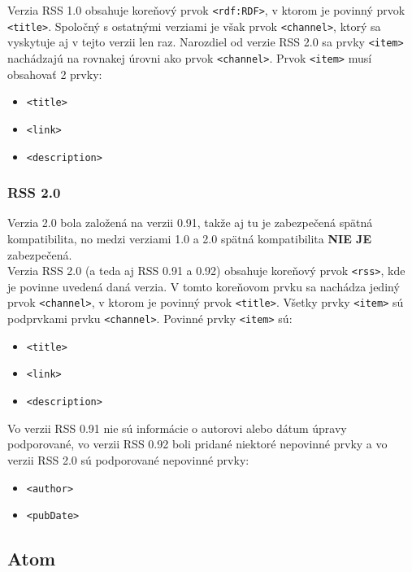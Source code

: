 \documentclass[a4paper, 11pt]{article}
\begin{document}
    Verzia RSS 1.0 obsahuje koreňový prvok \texttt{<rdf:RDF>}, v ktorom je povinný prvok \texttt{<title>}. Spoločný s ostatnými verziami je však prvok \texttt{<channel>}, ktorý sa vyskytuje aj v tejto verzii len raz. Narozdiel od verzie RSS 2.0 sa prvky \texttt{<item>} nachádzajú na rovnakej úrovni ako prvok \texttt{<channel>}.
    Prvok \texttt{<item>} musí obsahovať 2 prvky:
    \begin{itemize}
        \item \texttt{<title>}
        \item \texttt{<link>}
        \item \texttt{<description>}
    \end{itemize}
    
    \subsubsection{RSS 2.0}
    Verzia 2.0 bola založená na verzii 0.91, takže aj tu je zabezpečená spätná kompatibilita, no medzi verziami 1.0 a 2.0 spätná kompatibilita \textbf{NIE JE} zabezpečená\cite{rss2}.\\
    
    Verzia RSS 2.0 (a teda aj RSS 0.91 a 0.92) obsahuje koreňový prvok \texttt{<rss>}, kde je povinne uvedená daná verzia. V tomto koreňovom prvku sa nachádza jediný prvok \texttt{<channel>}, v ktorom je povinný prvok \texttt{<title>}.
    Všetky prvky \texttt{<item>} sú podprvkami prvku \texttt{<channel>}. Povinné prvky \texttt{<item>} sú:
    \begin{itemize}
        \item \texttt{<title>}
        \item \texttt{<link>}
        \item \texttt{<description>}
    \end{itemize}
    Vo verzii RSS 0.91 nie sú informácie o autorovi alebo dátum úpravy podporované, vo verzii RSS 0.92 boli pridané niektoré nepovinné prvky a vo verzii RSS 2.0 sú podporované nepovinné prvky:
    \begin{itemize}
        \item \texttt{<author>}
        \item \texttt{<pubDate>}
    \end{itemize} 

    \subsection{Atom}
    \label{Atom}
    
\end{document}
